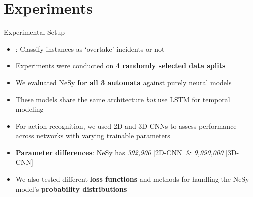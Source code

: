 \documentclass[10pt, aspectratio=169]{beamer}
\begin{document}
\section{Experiments}
{
    \begin{frame}
        \sectionpage%
    \end{frame}
}


\begin{frame}{Experimental Setup}
    \begin{itemize}
    \setlength{\itemsep}{10pt}
    \item {}: Classify instances as `overtake' incidents or not
    \item Experiments were conducted on \textbf{4 randomly selected data splits}
    \item We evaluated NeSy \textbf{for all 3 automata} against \textcolor{umBlueLighter}{purely neural models}
    \item These models share the same architecture \textit{but} use LSTM for temporal modeling
    \item For action recognition, we used 2D and 3D-CNNs to assess performance across networks with varying trainable parameters
    \item \textbf{Parameter differences}: NeSy has \textit{392,900} [2D-CNN] \& \textit{9,990,000} [3D-CNN]
    \item We also tested different \textbf{loss functions} and methods for handling the NeSy model's \textbf{probability distributions}
\end{itemize}
\end{frame}
\end{document}
